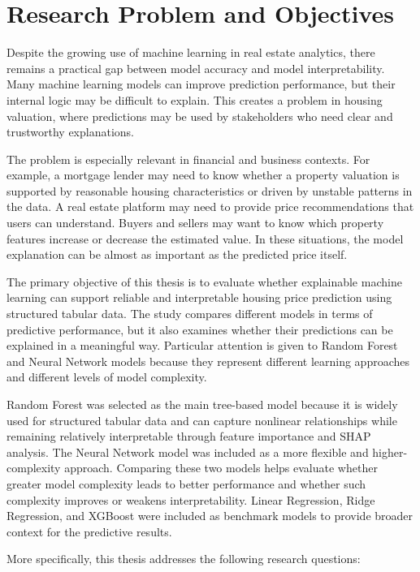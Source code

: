 \documentclass[12pt,a4paper,oneside,openany]{book}
\begin{document}
\section{Research Problem and Objectives}

Despite the growing use of machine learning in real estate analytics, there remains a practical gap between model accuracy and model interpretability. Many machine learning models can improve prediction performance, but their internal logic may be difficult to explain. This creates a problem in housing valuation, where predictions may be used by stakeholders who need clear and trustworthy explanations.

The problem is especially relevant in financial and business contexts. For example, a mortgage lender may need to know whether a property valuation is supported by reasonable housing characteristics or driven by unstable patterns in the data. A real estate platform may need to provide price recommendations that users can understand. Buyers and sellers may want to know which property features increase or decrease the estimated value. In these situations, the model explanation can be almost as important as the predicted price itself.

The primary objective of this thesis is to evaluate whether explainable machine learning can support reliable and interpretable housing price prediction using structured tabular data. The study compares different models in terms of predictive performance, but it also examines whether their predictions can be explained in a meaningful way. Particular attention is given to Random Forest and Neural Network models because they represent different learning approaches and different levels of model complexity.

Random Forest was selected as the main tree-based model because it is widely used for structured tabular data and can capture nonlinear relationships while remaining relatively interpretable through feature importance and SHAP analysis. The Neural Network model was included as a more flexible and higher-complexity approach. Comparing these two models helps evaluate whether greater model complexity leads to better performance and whether such complexity improves or weakens interpretability. Linear Regression, Ridge Regression, and XGBoost were included as benchmark models to provide broader context for the predictive results.

More specifically, this thesis addresses the following research questions:
\end{document}

